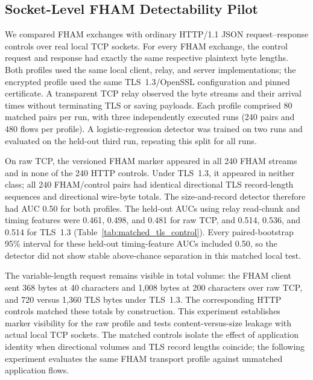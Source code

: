 \documentclass[preprint,12pt]{elsarticle}
\theoremstyle{plain}
\begin{document}
\subsection{Socket-Level FHAM Detectability Pilot}

We compared FHAM exchanges with ordinary HTTP/1.1 JSON request--response
controls over real local TCP sockets. For every FHAM exchange, the control
request and response had exactly the same respective plaintext byte lengths.
Both profiles used the same local client, relay, and server implementations;
the encrypted profile used the same TLS~1.3/OpenSSL configuration and pinned
certificate.
A transparent TCP relay observed the byte streams and their arrival times
without terminating TLS or saving payloads. Each profile comprised 80 matched
pairs per run, with three independently executed runs (240 pairs and 480
flows per profile). A logistic-regression detector was trained on two runs
and evaluated on the held-out third run, repeating this split for all runs.

On raw TCP, the versioned FHAM marker appeared in all 240 FHAM streams and in
none of the 240 HTTP controls. Under TLS~1.3, it appeared in neither class;
all 240 FHAM/control pairs had identical directional TLS record-length
sequences and directional wire-byte totals. The size-and-record detector
therefore had AUC 0.50 for both profiles. The held-out AUCs using relay
read-chunk and timing features were 0.461, 0.498, and 0.481 for raw TCP, and
0.514, 0.536, and 0.514 for TLS~1.3 (Table~\ref{tab:matched_tls_control}).
Every paired-bootstrap 95\% interval for these held-out timing-feature AUCs
included 0.50, so the detector did not show stable above-chance separation in
this matched local test.

The variable-length request remains visible in total volume: the FHAM client
sent 368 bytes at 40 characters and 1,008 bytes at 200 characters over raw
TCP, and 720 versus 1,360 TLS bytes under TLS~1.3. The corresponding HTTP
controls matched these totals by construction. This experiment establishes
marker visibility for the raw profile and tests content-versus-size leakage
with actual local TCP sockets. The matched controls isolate the effect of
application identity when directional volumes and TLS record lengths coincide;
the following experiment evaluates the same FHAM transport profile against
unmatched application flows.

\begin{table}[H]
\centering
\scriptsize
\setlength{\tabcolsep}{3pt}
\caption{Socket-level FHAM marker and held-out detectability results with matched HTTP controls.}
\label{tab:matched_tls_control}

\end{table}
\end{document}
